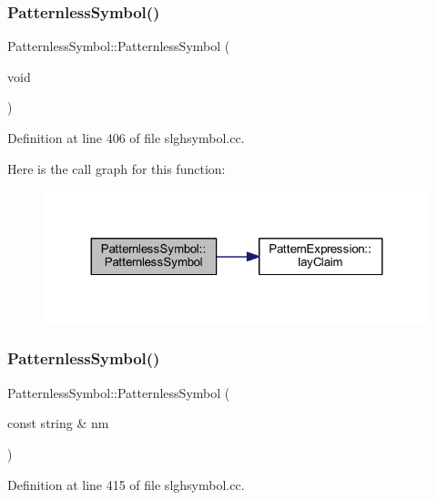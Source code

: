 \subsubsection{\texorpdfstring{PatternlessSymbol()}{PatternlessSymbol()}\hspace{0.1cm}{\footnotesize\ttfamily [1/2]}}
{\footnotesize\ttfamily Patternless\+Symbol\+::\+Patternless\+Symbol (\begin{DoxyParamCaption}\item[{void}]{ }\end{DoxyParamCaption})}



Definition at line 406 of file slghsymbol.\+cc.

Here is the call graph for this function\+:
\nopagebreak
\begin{figure}[H]
\begin{center}
\leavevmode
\includegraphics[width=324pt]{class_patternless_symbol_aa411b98c4eb3865831a9e175a3b56cda_cgraph}
\end{center}
\end{figure}
\mbox{\label{class_patternless_symbol_a26f3d4305a994ae113ae8e37ec90dddd}} 
\subsubsection{\texorpdfstring{PatternlessSymbol()}{PatternlessSymbol()}\hspace{0.1cm}{\footnotesize\ttfamily [2/2]}}
{\footnotesize\ttfamily Patternless\+Symbol\+::\+Patternless\+Symbol (\begin{DoxyParamCaption}\item[{const string \&}]{nm }\end{DoxyParamCaption})}



Definition at line 415 of file slghsymbol.\+cc.


